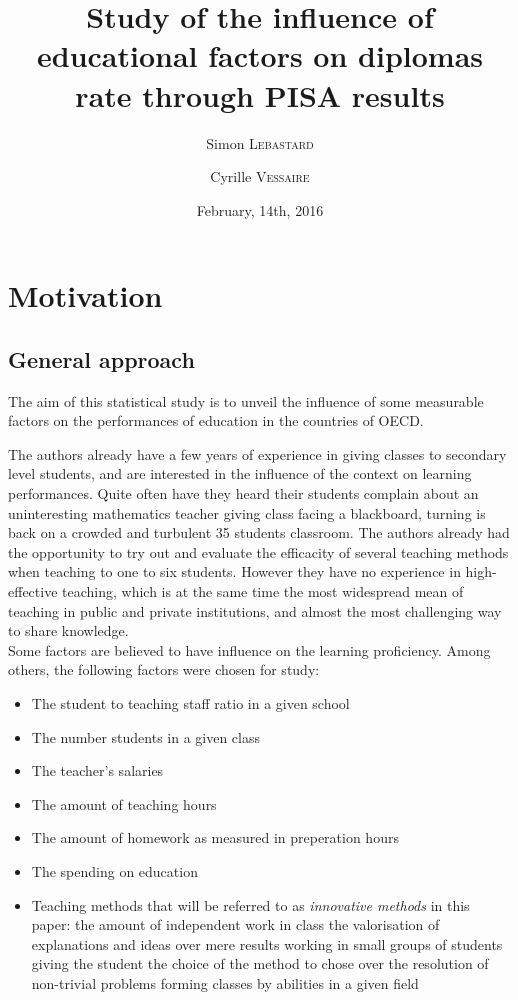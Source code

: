\documentclass[12pt,a4paper]{article}
\begin{document}
	
	
	\title{Study of the influence of educational factors on diplomas rate through PISA results}
	\author{Simon \textsc{Lebastard} \and Cyrille \textsc{Vessaire}}
	\date{February, 14th, 2016}
	
\maketitle
	
\section{Motivation}

\subsection{General approach}

The aim of this statistical study is to unveil the influence of some measurable factors on the performances of education in the countries of OECD.

The authors already have a few years of experience in giving classes to secondary level students, and are interested in the influence of the context on learning performances. Quite often have they heard their students complain about an uninteresting mathematics teacher giving class facing a blackboard, turning is back on a crowded and turbulent 35 students classroom. The authors already had the opportunity to try out and evaluate the efficacity of several teaching methods when teaching to one to six students. However they have no experience in high-effective teaching, which is at the same time the most widespread mean of teaching in public and private institutions, and almost the most challenging way to share knowledge.
\\
Some factors are believed to have influence on the learning proficiency. Among others, the following factors were chosen for study:

\begin{itemize}
	\item The student to teaching staff ratio in a given school
	\item The number students in a given class
	\item The teacher's salaries
	\item The amount of teaching hours
	\item The amount of homework as measured in preperation hours
	\item The spending on education
	\item Teaching methods that will be referred to as \textit{innovative methods} in this paper:
		\subitem the amount of independent work in class
		\subitem the valorisation of explanations and ideas over mere results
		\subitem working in small groups of students
		\subitem giving the student the choice of the method to chose over the resolution of non-trivial problems
		\subitem forming classes by abilities in a given field 
\end{itemize}
\end{document}
